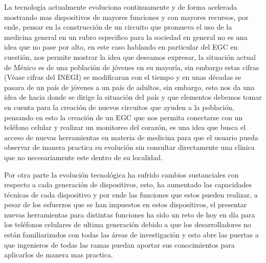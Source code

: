 
La tecnología actualmente evoluciona continuamente y de forma acelerada mostrando mas dispositivos de  mayores funciones y con mayores recursos, por ende, pensar en la construcción de un circuito que promueva el uso de la medicina general en un rubro especifico para la sociedad en general no es una idea que no pase por alto, en este caso hablando en particular del EGC en cuestión, nos permite mostrar la idea que deseamos expresar, la situación actual de México es de una población de jóvenes en su mayoría, sin embargo estas cifras (Véase cifras del INEGI) se modificaran con el tiempo y en unas décadas se pasara de un país de jóvenes a un país de adultos, sin embargo, esto nos da una idea de hacia donde se dirige la situación del país y que elementos debemos tomar en cuenta para la creación de nuevos circuitos que ayuden a la población, pensando en esto la creación de un EGC que nos permita conectarse con un teléfono celular y realizar un monitoreo  del corazón, es una idea que busca el acceso de nuevas herramientas en materia de medicina para que el usuario pueda observar de manera practica su evolución sin consultar directamente una clínica que no necesariamente este dentro de su localidad.\newline\par

Por otra parte la evolución tecnológica ha sufrido cambios sustanciales con respecto a cada generación de dispositivos, esto, ha aumentado las capacidades técnicas de cada dispositivo y por ende las funciones que estos pueden realizar, a pesar de los esfuerzos que se han impuestos en estos dispositivos, el presentar nuevas herramientas para distintas funciones ha sido un reto de hoy en día para los teléfonos celulares de ultima generación debido a que los desarrolladores no están familiarizados con todas las áreas de investigación y esto abre las puertas a que ingenieros de todas las ramas puedan aportar sus conocimientos para aplicarlos de manera mas practica.